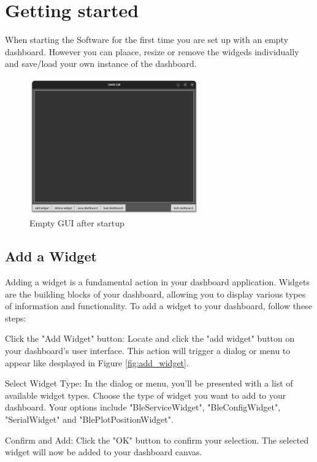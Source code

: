 \chapter{Getting started}

When starting the Software for the first time you are set up with an empty dashboard. 
However you can plaace, resize or remove the widgeds individually and save/load your own instance of the dashboard. 


\begin{figure}[!hbt]
	\centering
	\includegraphics[width=0.65\textwidth]{pictures/gui_idle.png}
	\caption{Empty GUI after startup}
	\label{fig:gui_idle}
\end{figure}



\section{Add a Widget}
Adding a widget is a fundamental action in your dashboard application. Widgets are the building blocks of your dashboard, allowing you to display various types of information and functionality. To add a widget to your dashboard, follow these steps:

Click the "Add Widget" button: Locate and click the "add widget" button on your dashboard's user interface. This action will trigger a dialog or menu to appear like desplayed in Figure \ref{fig:add_widget}.

Select Widget Type: In the dialog or menu, you'll be presented with a list of available widget types. Choose the type of widget you want to add to your dashboard. Your options include "BleServiceWidget", "BleConfigWidget", "SerialWidget" and "BlePlotPositionWidget". 

Confirm and Add: Click the "OK" button to confirm your selection. The selected widget will now be added to your dashboard canvas.

